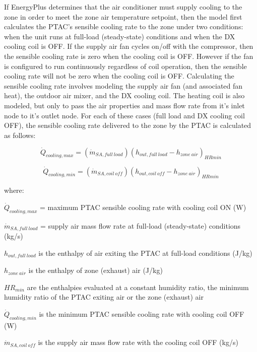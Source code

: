 If EnergyPlus determines that the air conditioner must supply cooling to the zone in order to meet the zone air temperature setpoint, then the model first calculates the PTAC's sensible cooling rate to the zone under two conditions: when the unit runs at full-load (steady-state) conditions and when the DX cooling coil is OFF. If the supply air fan cycles on/off with the compressor, then the sensible cooling rate is zero when the cooling coil is OFF. However if the fan is configured to run continuously regardless of coil operation, then the sensible cooling rate will not be zero when the cooling coil is OFF. Calculating the sensible cooling rate involves modeling the supply air fan (and associated fan heat), the outdoor air mixer, and the DX cooling coil. The heating coil is also modeled, but only to pass the air properties and mass flow rate from it's inlet node to it's outlet node. For each of these cases (full load and DX cooling coil OFF), the sensible cooling rate delivered to the zone by the PTAC is calculated as follows:

\begin{equation}
  \dot{Q}_{cooling,max} = \left( \dot{m}_{SA,full~load} \right) \left( h_{out,full~load} - h_{zone~air} \right)_{HRmin}
\end{equation}

\begin{equation}
  \dot{Q}_{cooling,min} = \left( \dot{m}_{SA,coil~off} \right) \left( h_{out,coil~off} - h_{zone~air} \right)_{HRmin}
\end{equation}

where:

\(\dot{Q}_{cooling,max}\) = maximum PTAC sensible cooling rate with cooling coil ON (W)

\(\dot{m}_{SA,full~load}\) = supply air mass flow rate at full-load (steady-state) conditions (kg/s)

\(h_{out,full~load}\) is the enthalpy of air exiting the PTAC at full-load conditions (J/kg)

\(h_{zone~air}\) is the enthalpy of zone (exhaust) air (J/kg)

\(HR_{min}\) are the enthalpies evaluated at a constant humidity ratio, the minimum humidity ratio of the PTAC exiting air or the zone (exhaust) air

\(\dot{Q}_{cooling,min}\) is the minimum PTAC sensible cooling rate with cooling coil OFF (W)

\(\dot{m}_{SA,coil~off}\) is the supply air mass flow rate with the cooling coil OFF (kg/s)

